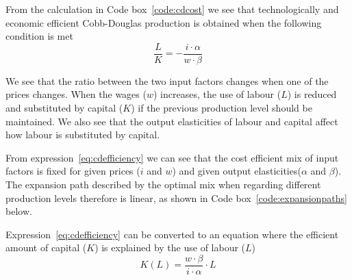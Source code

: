 \documentclass[11pt,fleqn]{book} %
\begin{document}
From the calculation in Code box~\ref{code:cdcost} we see that technologically and economic efficient Cobb-Douglas production is obtained when the following condition is met
\begin{equation} 
\label{eq:cdefficiency}
\frac{L}{K} = -\frac{i \cdot \alpha}{w \cdot \beta}
\end{equation}

We see that the ratio between the two input factors changes when one of the prices changes. When the wages ($w$) increases, the use of labour ($L$) is reduced and substituted by capital ($K$) if the previous production level should be maintained. We also see that the output elasticities of labour and capital affect how labour is substituted by capital.

From expression~\ref{eq:cdefficiency} we can see that the cost efficient mix of input factors is fixed for given prices ($i$ and $w$) and given output elasticities($\alpha$ and $\beta$). The expansion path described by the optimal mix when regarding different production levels therefore is linear, as shown in Code box~\ref{code:expansionpaths} below.

Expression~\ref{eq:cdefficiency} can be converted to an equation where the efficient amount of capital ($K$) is explained by the use of labour ($L$)
\begin{equation} 
\label{eq:cdefficiency2}
K(L) = \frac{w \cdot \beta}{i \cdot \alpha} \cdot L
\end{equation}
\end{document}
